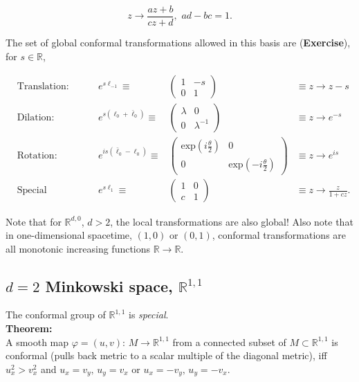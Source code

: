 \begin{equation}
z \rightarrow \frac{az + b}{c z + d}, \,\, ad-bc = 1.
\end{equation}

\noindent The set of global conformal transformations allowed in this basis are (\textbf{Exercise}), for $s \in \mathbb{R}$,

\begin{align}
&\text{Translation: } &e^{s \ell_{-1}} \equiv &\begin{pmatrix}1&-s \\ 0&1 \end{pmatrix} &\equiv z \rightarrow z - s \\
&\text{Dilation: } &e^{s (\ell_0 + \bar{\ell}_0)} \equiv &\begin{pmatrix}\lambda&0 \\ 0&\lambda^{-1} \end{pmatrix} &\equiv z \rightarrow e^{-s} \\
&\text{Rotation: } &e^{is (\bar{\ell}_0 - \ell_0)} \equiv &\begin{pmatrix}\text{exp}(i\frac{\theta}{2})&0 \\ 0&\text{exp}(-i\frac{\theta}{2}) \end{pmatrix} &\equiv z \rightarrow e^{is} \\
&\text{Special Conformal: } &e^{s \ell_1} \equiv &\begin{pmatrix}1&0 \\ c&1 \end{pmatrix} &\equiv z \rightarrow \frac{z}{1+c z}.
\end{align}

\noindent Note that for $\mathbb{R}^{d,0}$, $d>2$, the local transformations are also global! Also note that in one-dimensional spacetime, $(1,0)$ or $(0,1)$, conformal transformations are all monotonic increasing functions $\mathbb{R} \rightarrow \mathbb{R}$.

\subsection*{$d=2$ Minkowski space, $\mathbb{R}^{1,1}$}

\noindent The conformal group  of $\mathbb{R}^{1,1}$ is \textit{special}. \\

\noindent \textbf{Theorem:} \\

\noindent A smooth map $\varphi = (u,v) : \, M \rightarrow \mathbb{R}^{1,1}$ from a connected subset of $M \subset \mathbb{R}^{1,1}$ is conformal (pulls back metric to a scalar multiple of the diagonal metric), iff $u_x^2 > v_x^2$ and $u_x = v_y,\, u_y = v_x$ or $u_x = -v_y,\, u_y = -v_x$. \\

